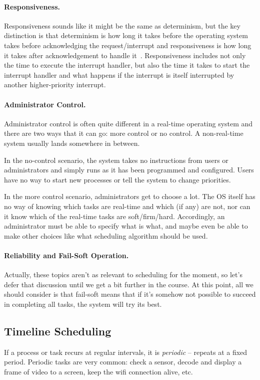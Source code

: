\paragraph{Responsiveness.} Responsiveness sounds like it might be the same as determinism, but the key distinction is that determinism is how long it takes before the operating system takes before acknowledging the request/interrupt and responsiveness is how long it takes after acknowledgement to handle it~\cite{osi}. Responsiveness includes not only the time to execute the interrupt handler, but also the time it takes to start the interrupt handler and what happens if the interrupt is itself interrupted by another higher-priority interrupt.

\paragraph{Administrator Control.} Administrator control is often quite different in a real-time operating system and there are two ways that it can go: more control or no control. A non-real-time system usually lands somewhere in between.

In the no-control scenario, the system takes no instructions from users or administrators and simply runs as it has been programmed and configured. Users have no way to start new processes or tell the system to change priorities.

In the more control scenario, administrators get to choose a lot. The OS itself has no way of knowing which tasks are real-time and which (if any) are not, nor can it know which of the real-time tasks are soft/firm/hard. Accordingly, an administrator must be able to specify what is what, and maybe even be able to make other choices like what scheduling algorithm should be used. 

\paragraph{Reliability and Fail-Soft Operation.} Actually, these topics aren't as relevant to scheduling for the moment, so let's defer that discussion until we get a bit further in the course. At this point, all we should consider is that fail-soft means that if it's somehow not possible to succeed in completing all tasks, the system will try its best.





\subsection*{Timeline Scheduling}
If a process or task recurs at regular intervals, it is \textit{periodic} -- repeats at a fixed period. Periodic tasks are very common: check a sensor, decode and display a frame of video to a screen, keep the wifi connection alive, etc.

